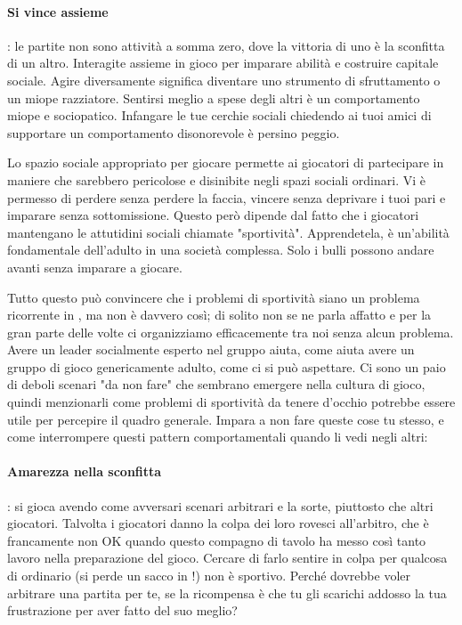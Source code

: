 \paragraph{Si vince assieme}: le partite non sono attività a somma zero, dove la vittoria di uno è la sconfitta di un altro. Interagite assieme in gioco per imparare abilità e costruire capitale sociale. Agire diversamente significa diventare uno strumento di sfruttamento o un miope razziatore. Sentirsi meglio a spese degli altri è un comportamento miope e sociopatico. Infangare le tue cerchie sociali chiedendo ai tuoi amici di supportare un comportamento disonorevole è persino peggio.

Lo spazio sociale appropriato per giocare permette ai giocatori di partecipare in maniere che sarebbero pericolose e disinibite negli spazi sociali ordinari. Vi è permesso di perdere senza perdere la faccia, vincere senza deprivare i tuoi pari e imparare senza sottomissione. Questo però dipende dal fatto che i giocatori mantengano le attutidini sociali chiamate "sportività". Apprendetela, è un'abilità fondamentale dell'adulto in una società complessa. Solo i bulli possono andare avanti senza imparare a giocare.

Tutto questo può convincere che i problemi di sportività siano un problema ricorrente in \dnd{}, ma non è davvero così; di solito non se ne parla affatto e per la gran parte delle volte ci organizziamo efficacemente tra noi senza alcun problema. Avere un leader socialmente esperto nel gruppo aiuta, come aiuta avere un gruppo di gioco genericamente adulto, come ci si può aspettare. Ci sono un paio di deboli scenari "da non fare" che sembrano emergere nella cultura di gioco, quindi menzionarli come problemi di sportività da tenere d'occhio potrebbe essere utile per percepire il quadro generale. Impara a non fare queste cose tu stesso, e come interrompere questi pattern comportamentali quando li vedi negli altri:

\paragraph{Amarezza nella sconfitta}: \dnd{} si gioca avendo come avversari scenari arbitrari e la sorte, piuttosto che altri giocatori. Talvolta i giocatori danno la colpa dei loro rovesci all'arbitro, che è francamente non OK quando questo compagno di tavolo ha messo così tanto lavoro nella preparazione del gioco. Cercare di farlo sentire in colpa per qualcosa di ordinario (si perde un sacco in \dnd{}!) non è sportivo. Perché dovrebbe voler arbitrare una partita per te, se la ricompensa è che tu gli scarichi addosso la tua frustrazione per aver fatto del suo meglio?

